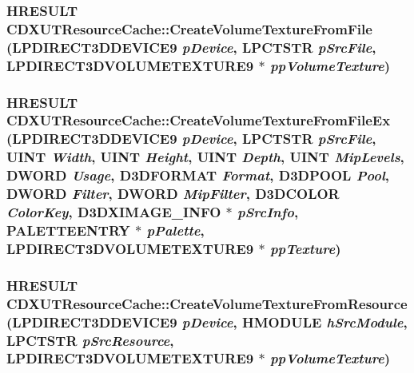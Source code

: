\label{class_c_d_x_u_t_resource_cache_a0da1d5be9bcc2332a63b6a9f3dac24c6}
\hypertarget{class_c_d_x_u_t_resource_cache_aeaf7cd870d8f048f32566aa2964e8b3e}{
\subsubsection[{CreateVolumeTextureFromFile}]{\setlength{\rightskip}{0pt plus 5cm}HRESULT CDXUTResourceCache::CreateVolumeTextureFromFile (LPDIRECT3DDEVICE9 {\em pDevice}, \/  LPCTSTR {\em pSrcFile}, \/  LPDIRECT3DVOLUMETEXTURE9 $\ast$ {\em ppVolumeTexture})}}
\label{class_c_d_x_u_t_resource_cache_aeaf7cd870d8f048f32566aa2964e8b3e}
\hypertarget{class_c_d_x_u_t_resource_cache_a6fdd52b77094e786e6c4eb6d19c4ec11}{
\subsubsection[{CreateVolumeTextureFromFileEx}]{\setlength{\rightskip}{0pt plus 5cm}HRESULT CDXUTResourceCache::CreateVolumeTextureFromFileEx (LPDIRECT3DDEVICE9 {\em pDevice}, \/  LPCTSTR {\em pSrcFile}, \/  UINT {\em Width}, \/  UINT {\em Height}, \/  UINT {\em Depth}, \/  UINT {\em MipLevels}, \/  DWORD {\em Usage}, \/  D3DFORMAT {\em Format}, \/  D3DPOOL {\em Pool}, \/  DWORD {\em Filter}, \/  DWORD {\em MipFilter}, \/  D3DCOLOR {\em ColorKey}, \/  D3DXIMAGE\_\-INFO $\ast$ {\em pSrcInfo}, \/  PALETTEENTRY $\ast$ {\em pPalette}, \/  LPDIRECT3DVOLUMETEXTURE9 $\ast$ {\em ppTexture})}}
\label{class_c_d_x_u_t_resource_cache_a6fdd52b77094e786e6c4eb6d19c4ec11}
\hypertarget{class_c_d_x_u_t_resource_cache_aa016831002fa2b54bd7cea38072c9a5c}{
\subsubsection[{CreateVolumeTextureFromResource}]{\setlength{\rightskip}{0pt plus 5cm}HRESULT CDXUTResourceCache::CreateVolumeTextureFromResource (LPDIRECT3DDEVICE9 {\em pDevice}, \/  HMODULE {\em hSrcModule}, \/  LPCTSTR {\em pSrcResource}, \/  LPDIRECT3DVOLUMETEXTURE9 $\ast$ {\em ppVolumeTexture})}}
